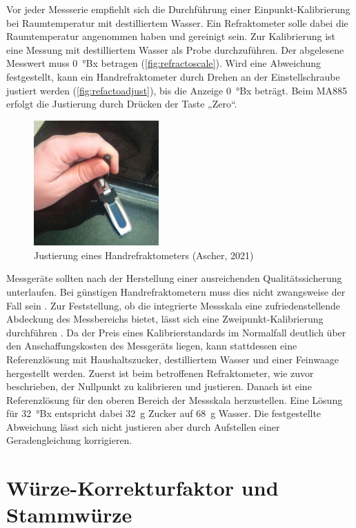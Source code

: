 \documentclass[a4paper,parskip=half]{scrartcl}
\begin{document}
Vor jeder Messserie empfiehlt sich die Durchführung einer
Einpunkt-Kalibrierung bei Raumtemperatur mit destilliertem
Wasser. Ein Refraktometer solle dabei die Raumtemperatur
angenommen haben und gereinigt sein. Zur Kalibrierung ist
eine Messung mit destilliertem Wasser als Probe durchzuführen.
Der abgelesene Messwert muss 0~°Bx betragen
(\autoref{fig:refractoscale}).
Wird eine Abweichung festgestellt, kann ein Handrefraktometer durch
Drehen an der Einstellschraube justiert werden (\autoref{fig:refactoadjust}),
bis die Anzeige 0~°Bx beträgt. Beim MA885 erfolgt die
Justierung durch Drücken der Taste „Zero“.
\parencites[44]{Bonham2001}{Depalma2017}[50\psq]{Terrill2013}

\begin{figure}[h]
\centering
\includegraphics[width=4.8cm]{images/adjust.jpg}
\caption{Justierung eines Handrefraktometers (Ascher, 2021)}
\label{fig:refactoadjust}
\end{figure}

Messgeräte sollten nach der Herstellung einer ausreichenden
Qualitätssicherung unterlaufen. Bei günstigen Handrefraktometern
muss dies nicht zwangsweise der Fall sein \parencite{Troester2012}.
Zur Feststellung,
ob die integrierte Messskala eine zufriedenstellende Abdeckung
des Messbereichs bietet, lässt sich eine Zweipunkt-Kalibrierung
durchführen \parencites{Earl2015}[50\psq]{Terrill2013}. Da der Preis
eines Kalibrierstandards im Normalfall
deutlich über den Anschaffungskosten des Messgeräts
liegen, kann stattdessen eine Referenzlösung mit Haushaltszucker,
destilliertem Wasser und einer Feinwaage hergestellt werden. Zuerst
ist beim betroffenen Refraktometer, wie zuvor beschrieben, der
Nullpunkt zu kalibrieren und justieren. Danach ist eine Referenzlösung
für den oberen Bereich der Messskala herzustellen. Eine Lösung 
für 32~°Bx entspricht dabei 32~g Zucker auf 68~g Wasser.
Die festgestellte Abweichung lässt sich nicht justieren aber
durch Aufstellen einer Geradengleichung korrigieren.

\section*{Würze-Korrekturfaktor und Stammwürze}
\end{document}
